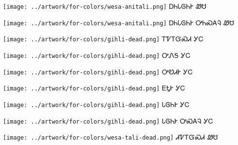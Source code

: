 \documentclass[avery5371]{flashcards}%
\begin{document}
\begin{flashcard}{
\texttt{[image: ../artwork/for-colors/wesa-anitali.png]}
}
\Huge ᎠᏂᏓᎶᏂᎨ ᏪᏌ
\end{flashcard}

\begin{flashcard}{
\texttt{[image: ../artwork/for-colors/wesa-anitali.png]}
}
\Huge ᎠᏂᏓᎶᏂᎨ ᎤᏂᏍᎪᎸ ᏪᏌ
\end{flashcard}

\begin{flashcard}{
\texttt{[image: ../artwork/for-colors/gihli-dead.png]}
}
\Huge ᎢᏤᎢᏳᏍᏗ ᎩᏟ
\end{flashcard}

\begin{flashcard}{
\texttt{[image: ../artwork/for-colors/gihli-dead.png]}
}
\Huge ᎤᏁᎦ ᎩᏟ
\end{flashcard}

\begin{flashcard}{
\texttt{[image: ../artwork/for-colors/gihli-dead.png]}
}
\Huge ᎤᏬᏗᎨ ᎩᏟ
\end{flashcard}

\begin{flashcard}{
\texttt{[image: ../artwork/for-colors/gihli-dead.png]}
}
\Huge ᎬᎿᎨ ᎩᏟ
\end{flashcard}

\begin{flashcard}{
\texttt{[image: ../artwork/for-colors/gihli-dead.png]}
}
\Huge ᏓᎶᏂᎨ ᎩᏟ
\end{flashcard}

\begin{flashcard}{
\texttt{[image: ../artwork/for-colors/gihli-dead.png]}
}
\Huge ᏓᎶᏂᎨ ᎤᏍᎪᎸ ᎩᏟ
\end{flashcard}


\begin{flashcard}{
\texttt{[image: ../artwork/for-colors/wesa-tali-dead.png]}
}
\Huge ᏗᏤᎢᏳᏍᏗ ᏪᏌ
\end{flashcard}
\end{document}
